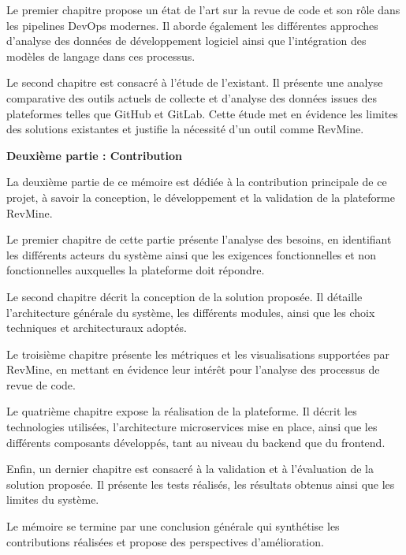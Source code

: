 Le premier chapitre propose un état de l’art sur la revue de code et son rôle dans les pipelines DevOps modernes. Il aborde également les différentes approches d’analyse des données de développement logiciel ainsi que l’intégration des modèles de langage dans ces processus.

Le second chapitre est consacré à l’étude de l’existant. Il présente une analyse comparative des outils actuels de collecte et d’analyse des données issues des plateformes telles que GitHub et GitLab. Cette étude met en évidence les limites des solutions existantes et justifie la nécessité d’un outil comme RevMine.

\textbf{Deuxième partie : Contribution}

La deuxième partie de ce mémoire est dédiée à la contribution principale de ce projet, à savoir la conception, le développement et la validation de la plateforme RevMine.

Le premier chapitre de cette partie présente l’analyse des besoins, en identifiant les différents acteurs du système ainsi que les exigences fonctionnelles et non fonctionnelles auxquelles la plateforme doit répondre.

Le second chapitre décrit la conception de la solution proposée. Il détaille l’architecture générale du système, les différents modules, ainsi que les choix techniques et architecturaux adoptés.

Le troisième chapitre présente les métriques et les visualisations supportées par RevMine, en mettant en évidence leur intérêt pour l’analyse des processus de revue de code.

Le quatrième chapitre expose la réalisation de la plateforme. Il décrit les technologies utilisées, l’architecture microservices mise en place, ainsi que les différents composants développés, tant au niveau du backend que du frontend.

Enfin, un dernier chapitre est consacré à la validation et à l’évaluation de la solution proposée. Il présente les tests réalisés, les résultats obtenus ainsi que les limites du système.

Le mémoire se termine par une conclusion générale qui synthétise les contributions réalisées et propose des perspectives d’amélioration.